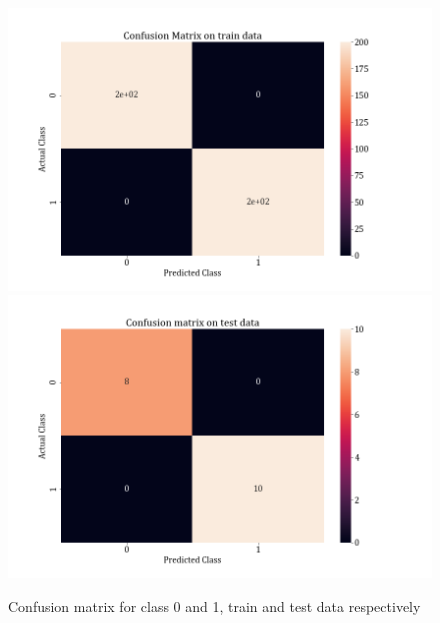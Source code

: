 \documentclass[11pt,a4paper]{article}
\begin{document}
\begin{figure}[H]
\centering
\includegraphics[scale=0.4]{images/1A_ovo_conf01_train.png}
\includegraphics[scale=0.4]{images/1A_ovo_conf01_test.png}
\caption{Confusion matrix for class 0 and 1, train and test data respectively}
\end{figure}
\end{document}
